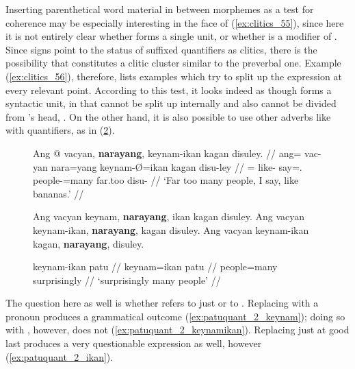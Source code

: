 Inserting parenthetical word material in between morphemes as a test for
coherence may be especially interesting in the face of (\ref{ex:clitics_55}),
since here it is not entirely clear whether  forms a single unit, or whether  is a modifier of . Since signs
point to the status of suffixed quantifiers as clitics, there is the
possibility that  constitutes a
clitic cluster similar to the preverbal one. Example (\ref{ex:clitics_56}),
therefore, lists examples which try to split up the expression at every
relevant point. According to this test, it looks indeed as though
 forms a syntactic unit, in that 
 cannot be split up internally and also cannot be
divided from 's head, . On the
other hand, it is also possible to use other adverbs like
 with quantifiers, as in (\ref{ex:patuquant_1}).

\begin{figure}[h]
\pex\label{ex:clitics_56}
\a\label{ex:clitics_56a}\begingl
	\gla Ang @ vacyan, \textbf{narayang}, keynam-ikan kagan disuley. //
	\glb ang= vac-yan nara=yang keynam-Ø=ikan kagan disu-ley //
	\glc \AgtT{}= like-\TplM{} say=\Fsg{}.\Aarg{} people-\Top{}=many far.too
		disu-\PargI{} //
	\glft `Far too many people, I say, like bananas.' //
\endgl

\a\label{ex:clitics_56b}
	\ljudge{*} Ang vacyan keynam, \textbf{narayang}, ikan kagan disuley.
\a\label{ex:clitics_56c}
	\ljudge{*} Ang vacyan keynam-ikan, \textbf{narayang}, kagan disuley.
\a\label{ex:clitics_56d}
	Ang vacyan keynam-ikan kagan, \textbf{narayang}, disuley.
\xe
\end{figure}

\begin{figure}[h]
\ex\label{ex:patuquant_1}\begingl
	\gla keynam-ikan patu //
	\glb keynam=ikan patu //
	\glc people=many surprisingly //
	\glft `surprisingly many people' //
\endgl\xe
\end{figure}

The question here as well is whether  refers to just 
 or to . 
Replacing  with a pronoun produces a grammatical outcome
(\ref{ex:patuquant_2_keynam}); doing so with ,
however, does not (\ref{ex:patuquant_2_keynamikan}). Replacing just 
 at good last produces a very questionable expression as
well, however (\ref{ex:patuquant_2_ikan}).

